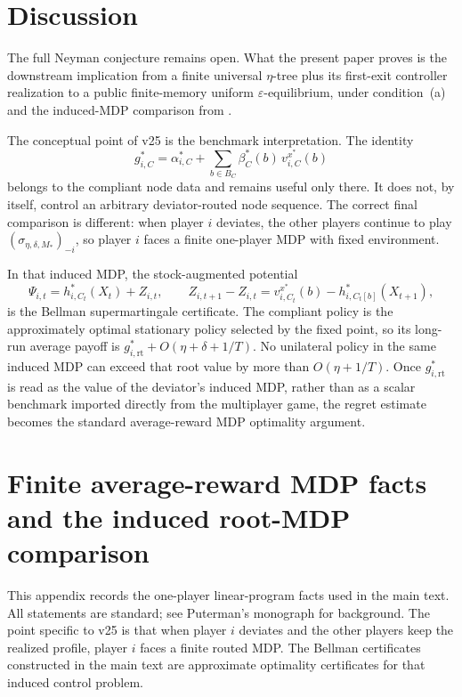 \documentclass[12pt]{article}
\theoremstyle{definition}
\newcommand{\eps}{\varepsilon}
\newcommand{\1}{\mathbf{1}}
\begin{document}
\section{Discussion}

The full Neyman conjecture remains open. What the present paper proves is the
downstream implication from a finite universal $\eta$-tree plus its first-exit
controller realization to a public finite-memory uniform $\eps$-equilibrium,
under condition~\textnormal{(a)} and the induced-MDP comparison from
.

The conceptual point of v25 is the benchmark interpretation. The identity
\[
g_{i,C}^*
=
\alpha_{i,C}^*
+
\sum_{b\in B_C}\beta_C^*(b)\,v_{i,C}^{x^*}(b)
\]
belongs to the compliant node data and remains useful only there. It does not,
by itself, control an arbitrary deviator-routed node sequence. The correct final
comparison is different: when player $i$ deviates, the other players continue to
play $(\sigma_{\eta,\delta,M_*})_{-i}$, so player $i$ faces a finite one-player
MDP with fixed environment.

In that induced MDP, the stock-augmented potential
\[
\Psi_{i,t}
=
h_{i,C_t}^*(X_t)+Z_{i,t},
\qquad
Z_{i,t+1}-Z_{i,t}=v_{i,C_t}^{x^*}(b)-h_{i,C_t[b]}^*(X_{t+1}),
\]
is the Bellman supermartingale certificate. The compliant policy is the
approximately optimal stationary policy selected by the fixed point, so its
long-run average payoff is $g_{i,\mathrm{rt}}^*+O(\eta+\delta+1/T)$. No unilateral
policy in the same induced MDP can exceed that root value by more than
$O(\eta+1/T)$. Once $g_{i,\mathrm{rt}}^*$ is read as the value of the deviator's
induced MDP, rather than as a scalar benchmark imported directly from the
multiplayer game, the regret estimate becomes the standard average-reward MDP
optimality argument.
\appendix



\section{Finite average-reward MDP facts and the induced root-MDP comparison}
\label{app:mdp}

This appendix records the one-player linear-program facts used in the main text.
All statements are standard; see Puterman's monograph \cite{Puterman1994} for
background. The point specific to v25 is that when player $i$ deviates and the
other players keep the realized profile, player $i$ faces a finite routed MDP.
The Bellman certificates constructed in the main text are approximate optimality
certificates for that induced control problem.
\end{document}
